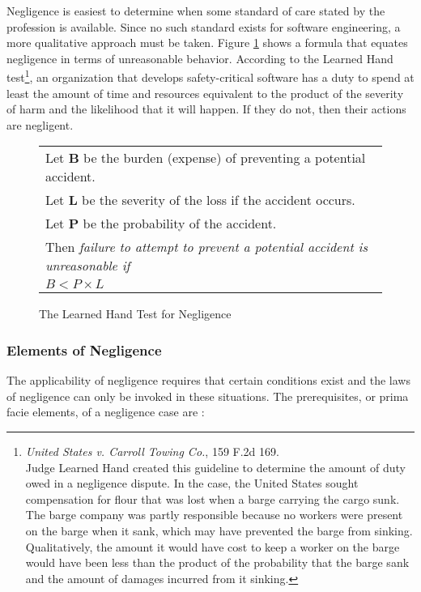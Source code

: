 Negligence is easiest to determine when some standard of care stated by the
profession is available. Since no such standard exists for software engineering,
a more qualitative approach must be taken. Figure \ref{fig:handtest} shows a
formula that equates negligence in terms of unreasonable behavior.  According to
the Learned Hand test\footnote{\textit{United States v. Carroll Towing Co.}, 159
F.2d 169.\\ Judge Learned Hand created this guideline to determine the amount of
duty owed in a negligence dispute. In the case, the United States sought
compensation for flour that was lost when a barge carrying the cargo sunk. The
barge company was partly responsible because no workers were present on the
barge when it sank, which may have prevented the barge from sinking.
Qualitatively, the amount it would have cost to keep a worker on the barge would
have been less than the product of the probability that the barge sank and the
amount of damages incurred from it sinking.}, an organization that develops
safety-critical software has a duty to spend at least the amount of time and
resources equivalent to the product of the severity of harm and the likelihood 
that it will happen. If they do not, then their actions are negligent.

\begin{figure}
\begin{narrow}{-1.5in}{-1.5in}\begin{center}
\begin{tabular}{|l|}
\hline
	Let \textbf{B} be the burden (expense) of preventing a potential accident.\\
	Let \textbf{L} be the severity of the loss if the accident occurs.\\
	Let \textbf{P} be the probability of the accident.\\[6pt]
	Then \textit{failure to attempt to prevent a potential accident is 
	unreasonable if}\\[8pt]

      \centerline{\(B < P \times L\)}
\\[3pt]
\hline
\end{tabular}
\end{center}\end{narrow}
\caption{The Learned Hand Test for Negligence}
\label{fig:handtest}
\end{figure}

\subsubsection{Elements of Negligence}\label{SS:Elements}
The applicability of negligence requires that certain conditions exist and the
laws of negligence can only be invoked in these situations. The prerequisites,
or prima facie elements, of a negligence case are \cite{Dobbs01}:

